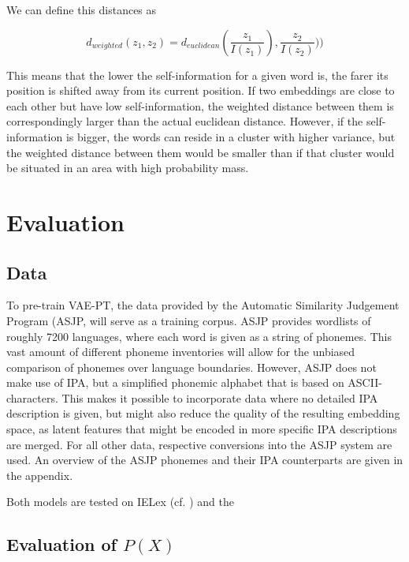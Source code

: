 \documentclass[6pt]{article}
\begin{document}
{We can define this distances as 

\begin{equation}
d_{weighted}(z_1,z_2) = d_{euclidean}(\frac{z_1}{I(z_1)}),\frac{z_2}{I(z_2)}))
\end{equation}

This means that the lower the self-information for a given word is, the farer its position is shifted away from its current position. If two embeddings are close to each other but have low self-information, the weighted distance between them is correspondingly larger than the actual euclidean distance. However, if the self-information is bigger, the words can reside in a cluster with higher variance, but the weighted distance between them would be smaller than if that cluster would be situated in an area with high probability mass.


\section{Evaluation}
\subsection{Data}
To pre-train VAE-PT,  the data provided by the Automatic Similarity Judgement Program (ASJP, \cite{wichmann2010asjp} will serve as a training corpus. ASJP provides wordlists of roughly 7200 languages, where each word is given as a string of phonemes. This vast amount of different phoneme inventories will allow for the unbiased comparison of phonemes over language boundaries. However, ASJP does not make use of IPA, but a simplified phonemic alphabet that is based on ASCII-characters. This makes it possible to incorporate data where no detailed IPA description is given, but might also reduce the quality of the resulting embedding space, as latent features that might be encoded in more specific IPA descriptions are merged. For all other data, respective conversions into the ASJP system are used.  An overview of the ASJP phonemes and their IPA counterparts are given in the appendix.

Both models are tested on IELex (cf. \cite{dunn2012indo}) and the 
\subsection{Evaluation of $P(X)$}

}
\end{document}
